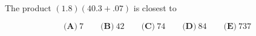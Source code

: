 

The product $ (1.8)(40.3+.07)$ is closest to

\[ \textbf{(A)}\ 7 \qquad
\textbf{(B)}\ 42 \qquad
\textbf{(C)}\ 74 \qquad
\textbf{(D)}\ 84 \qquad
\textbf{(E)}\ 737
\]